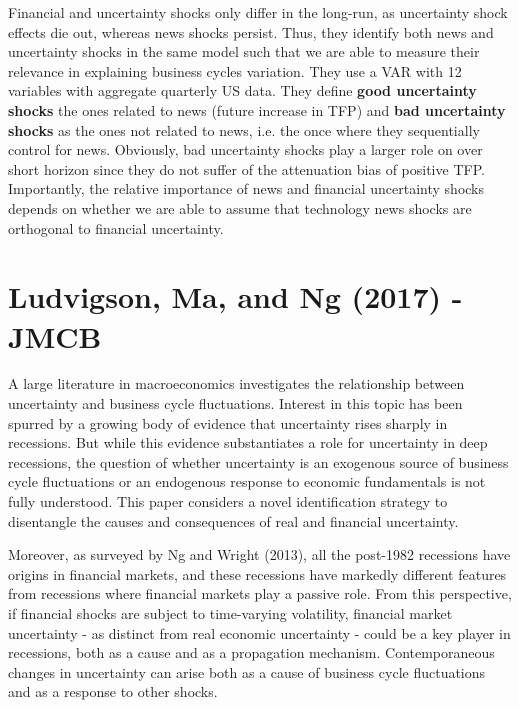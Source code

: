 \documentclass{article}
\begin{document}
{Financial and uncertainty shocks only differ in the long-run, as uncertainty shock effects die out, whereas news shocks persist. Thus, they identify both news and uncertainty shocks in the same model such that we are able to measure their relevance in explaining business cycles variation. They use a VAR with 12 variables with aggregate quarterly US data. They define \textbf{good uncertainty shocks} the ones related to news (future increase in TFP) and \textbf{bad uncertainty shocks} as the ones not related to news, i.e. the once where they sequentially control for news. Obviously, bad uncertainty shocks play a larger role on over short horizon since they do not suffer of the attenuation bias of positive TFP. Importantly, the relative importance of news and financial uncertainty shocks depends on whether we are able to assume that technology news shocks are orthogonal to financial uncertainty.


\section*{Ludvigson, Ma, and Ng (2017) - JMCB}

A large literature in macroeconomics investigates the relationship between uncertainty and business cycle fluctuations. Interest in this topic has been spurred by a growing body of evidence that uncertainty rises sharply in recessions. But while this evidence substantiates a role for uncertainty in deep recessions, the question of whether uncertainty is an exogenous source of business cycle fluctuations or an endogenous response to economic fundamentals is not fully understood. This paper considers a novel identification strategy to disentangle the causes and consequences of real and financial uncertainty. 

Moreover, as surveyed by Ng and Wright (2013), all the post-1982 recessions have origins in financial markets, and these recessions have markedly different features from recessions where financial markets play a passive role. From this perspective, if financial shocks are subject to time-varying volatility, financial market uncertainty - as distinct from real economic uncertainty - could be a key player in recessions, both as a cause and as a propagation mechanism. Contemporaneous changes in uncertainty can arise both as a cause of business cycle fluctuations and as a response to other shocks. 

}
\end{document}
